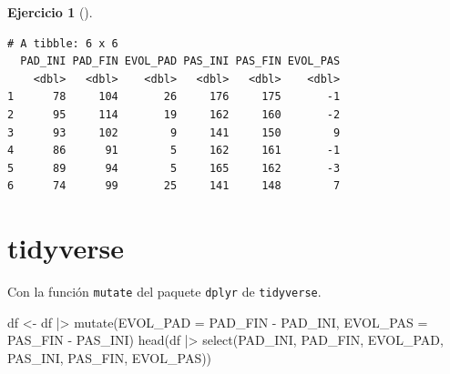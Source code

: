 \documentclass[
  spanish,
  a4paper,
]{scrreport}
\newenvironment{Shaded}{\begin{snugshade}}{\end{snugshade}}
\newcommand{\AttributeTok}[1]{\textcolor[rgb]{0.40,0.45,0.13}{#1}}
\newcommand{\FunctionTok}[1]{\textcolor[rgb]{0.28,0.35,0.67}{#1}}
\newcommand{\NormalTok}[1]{\textcolor[rgb]{0.00,0.23,0.31}{#1}}
\newcommand{\OtherTok}[1]{\textcolor[rgb]{0.00,0.23,0.31}{#1}}
\newcommand{\SpecialCharTok}[1]{\textcolor[rgb]{0.37,0.37,0.37}{#1}}
\newcommand{\StringTok}[1]{\textcolor[rgb]{0.13,0.47,0.30}{#1}}
\theoremstyle{definition}
\newtheorem{exercise}{Ejercicio}[chapter]
\theoremstyle{remark}
\begin{document}
\begin{exercise}[]
\begin{enumerate}
\begin{tcolorbox}
\begin{Shaded}
\end{Shaded}

\begin{verbatim}
# A tibble: 6 x 6
  PAD_INI PAD_FIN EVOL_PAD PAS_INI PAS_FIN EVOL_PAS
    <dbl>   <dbl>    <dbl>   <dbl>   <dbl>    <dbl>
1      78     104       26     176     175       -1
2      95     114       19     162     160       -2
3      93     102        9     141     150        9
4      86      91        5     162     161       -1
5      89      94        5     165     162       -3
6      74      99       25     141     148        7
\end{verbatim}

  \section{tidyverse}

  Con la función \texttt{mutate} del paquete \texttt{dplyr} de
  \texttt{tidyverse}.

\begin{Shaded}
\begin{Highlighting}[]
\NormalTok{df }\OtherTok{\textless{}{-}}\NormalTok{ df }\SpecialCharTok{|\textgreater{}} \FunctionTok{mutate}\NormalTok{(}\AttributeTok{EVOL\_PAD =}\NormalTok{ PAD\_FIN }\SpecialCharTok{{-}}\NormalTok{ PAD\_INI, }\AttributeTok{EVOL\_PAS =}\NormalTok{ PAS\_FIN }\SpecialCharTok{{-}}\NormalTok{ PAS\_INI)}
\FunctionTok{head}\NormalTok{(df }\SpecialCharTok{|\textgreater{}} \FunctionTok{select}\NormalTok{(PAD\_INI, PAD\_FIN, EVOL\_PAD, PAS\_INI, PAS\_FIN, EVOL\_PAS))}
\end{Highlighting}
\end{Shaded}


\end{tcolorbox}
\end{enumerate}
\end{exercise}
\end{document}
